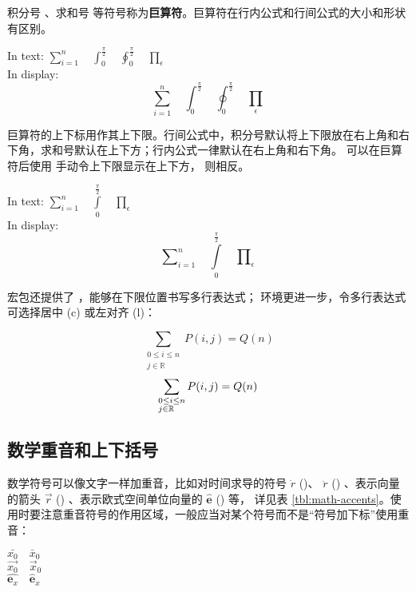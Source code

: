 积分号 、求和号  等符号称为\textbf{巨算符}。巨算符在行内公式和行间公式的大小和形状有区别。
\begin{example}
In text: 
$\sum_{i=1}^n \quad
\int_0^{\frac{\pi}{2}} \quad
\oint_0^{\frac{\pi}{2}} \quad
\prod_\epsilon $ \\
In display:
\[\sum_{i=1}^n \quad
\int_0^{\frac{\pi}{2}} \quad
\oint_0^{\frac{\pi}{2}} \quad
\prod_\epsilon \]
\end{example}

巨算符的上下标用作其上下限。行间公式中，积分号默认将上下限放在右上角和右下角，求和号默认在上下方；行内公式一律默认在右上角和右下角。
可以在巨算符后使用  手动令上下限显示在上下方， 则相反。
\begin{example}
In text: 
$\sum\limits_{i=1}^n \quad
\int\limits_0^{\frac{\pi}{2}} \quad
\prod\limits_\epsilon $ \\
In display:
\[\sum\nolimits_{i=1}^n \quad
\int\limits_0^{\frac{\pi}{2}} \quad
\prod\nolimits_\epsilon \]
\end{example}

 宏包还提供了 ，能够在下限位置书写多行表达式； 
环境更进一步，令多行表达式可选择居中 (c) 或左对齐 (l)：
\begin{example}
\[
\sum_{\substack{0\le i\le n \\
  j\in \mathbb{R}}}
P(i,j) = Q(n)
\]
\[
\sum_{\begin{subarray}{l}
  0\le i\le n \\
  j\in \mathbb{R}
\end{subarray}}
P(i,j) = Q(n)
\]
\end{example}

\subsection{数学重音和上下括号}

数学符号可以像文字一样加重音，比如对时间求导的符号 $\dot{r}$ ()、 $\ddot{r}$ ()
、表示向量的箭头 $\vec{r}$ () 、表示欧式空间单位向量的 $\hat{\mathbf{e}}$ () 等，
详见表 \ref{tbl:math-accents}。使用时要注意重音符号的作用区域，一般应当对某个符号而不是“符号加下标”使用重音：
\begin{example}
$\bar{x_0} \quad \bar{x}_0$\\[5pt]
$\vec{x_0} \quad \vec{x}_0$\\[5pt]
$\hat{\mathbf{e}_x} \quad
 \hat{\mathbf{e}}_x$
\end{example}

